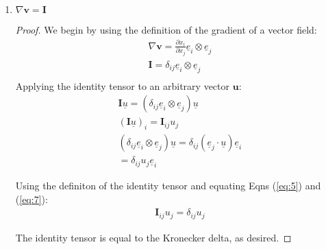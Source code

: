 \begin{problem}
    \noindent
    \normalfont
\end{problem}
    \begin{enumerate}
        \item $\nabla \mathbf{v}=\mathbf{I}$
        \begin{proof}


        
        We begin by using the definition of the gradient of a vector field:
        \begin{align}
            \nabla \mathbf{v}=\frac{ \partial x_{i} }{ \partial x_{j} } \underline{e}_{i}\otimes \underline{e}_{j} \\
            \mathbf{I} = \delta_{ij}\underline{e}_{i}\otimes \underline{e}_{j} \\
            \end{align}
        Applying the identity tensor to an arbitrary vector $\mathbf{u}$:
        \begin{align}
            \mathbf{I}\underline{u} = (\delta_{ij}\underline{e}_{i}\otimes \underline{e}_{j})\underline{u} \\
            (\mathbf{I}\underline{u})_{i}=\mathbf{I}_{ij}u_{j} \label{eq:5} \\
            (\delta_{ij}\underline{e}_{i}\otimes \underline{e}_{j})\underline{u}=\delta_{ij}(\underline{e}_{j}\cdot \underline{u})\underline{e}_{i} \\
            =\delta_{ij}u_{j}\underline{e}_{i} \label{eq:7}
        \end{align}

        Using the definiton of the identity tensor and equating Eqns (\ref{eq:5}) and (\ref{eq:7}):
        \begin{align}
            \mathbf{I}_{ij}u_{j}=\delta_{ij}u_{j} \label{eq:8}
            \end{align}

        The identity tensor is equal to the Kronecker delta, as desired.
        \end{proof}


\end{enumerate}
